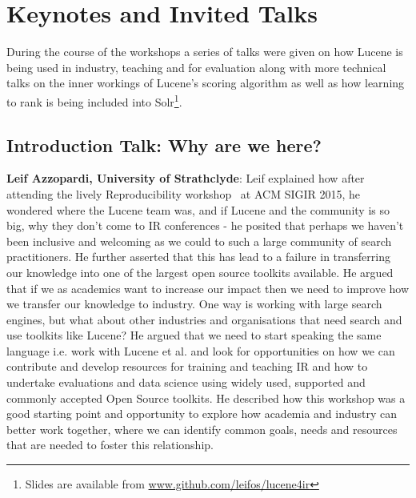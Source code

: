 \section{Keynotes and Invited Talks}
During the course of the workshops a series of talks were given on how Lucene is being used in industry, teaching and for evaluation along with more technical talks on the inner workings of Lucene's scoring algorithm as well as how learning to rank is being included into Solr\footnote{\scriptsize{Slides are available from \url{www.github.com/leifos/lucene4ir}}}. 

\subsection*{Introduction Talk: Why are we here?}
{\bf Leif Azzopardi, University of Strathclyde}:
Leif explained how after attending the lively Reproducibility workshop~\cite{arguello2016repro} at ACM SIGIR 2015, he wondered where the Lucene team was, and if Lucene and the community is so big, why they don't come to IR conferences - he posited that perhaps we haven't been inclusive and welcoming as we could to such a large community of search practitioners. He further asserted that this has lead to a failure in transferring our knowledge into one of the largest open source toolkits available. He argued that if we as academics want to increase our impact then we need to improve how we transfer our knowledge to industry. One way is working with large search engines, but what about other industries and organisations that need search and use toolkits like Lucene? He argued that we need to start speaking the same language i.e. work with Lucene et al. and look for opportunities on how we can contribute and develop resources for training and teaching IR and how to undertake evaluations and data science using widely used, supported and commonly accepted Open Source toolkits. He described how this workshop was a good starting point and opportunity to explore how academia and industry can better work together, where we can identify common goals, needs and resources that are needed to foster this relationship. 










